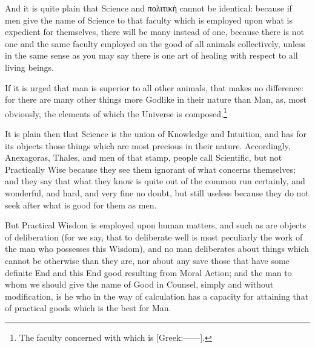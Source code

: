 And it is quite plain that Science and
πολιτικὴ cannot be identical: because
if men give the name of Science to that faculty which is employed upon what is
expedient for themselves, there will be many instead of one, because there is
not one and the same faculty employed on the good of all animals collectively,
unless in the same sense as you may say there is one art of healing with
respect to all living beings.

If it is urged that man is superior to all other animals, that makes no
difference: for there are many other things more Godlike in their nature than
Man, as, most obviously, the elements of which the Universe is
composed.\footnote{The faculty concerned with which is [Greek:——].}

It is plain then that Science is the union of Knowledge and Intuition, and has
for its objects those things which are most precious in their nature.
Accordingly, Anexagoras, Thales, and men of that stamp, people call Scientific,
but not Practically Wise because they see them ignorant of what concerns
themselves; and they say that what they know is quite out of the common run
certainly, and wonderful, and hard, and very fine no doubt, but still useless
because they do not seek after what is good for them as men.


But Practical Wisdom is employed upon human matters, and such as are objects of
deliberation (for we say, that to deliberate well is most peculiarly the work
of the man who possesses this Wisdom), and no man deliberates about things
which cannot be otherwise than they are, nor about any save those that have
some definite End and this End good resulting from Moral Action; and the man to
whom we should give the name of Good in Counsel, simply and without
modification, is he who in the way of calculation has a capacity for attaining
that of practical goods which is the best for Man.

